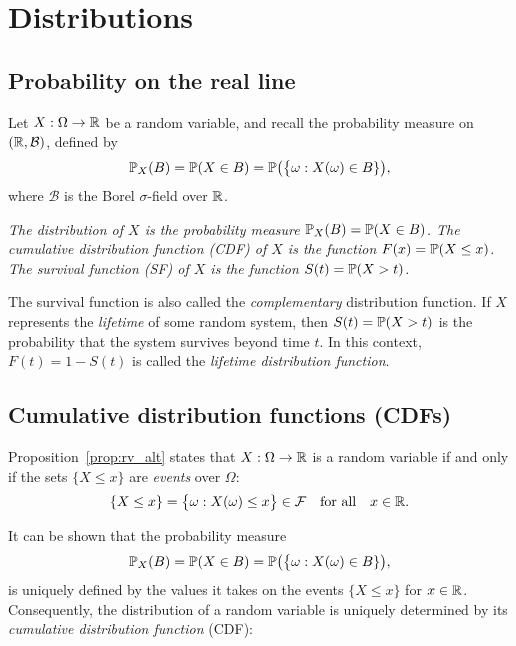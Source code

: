 \chapter{Distributions}\label{chap:distributions}
\section{Probability on the real line}
Let $X:\Omega\to\mathbb{R}$ be a random variable, and recall the probability measure on $(\mathbb{R}, \mathcal{B})$,  defined by
\[
\mathbb{P}_X(B) = \mathbb{P}(X\in B) = \mathbb{P}\big(\big\{\omega:X(\omega)\in B\}\big),
\]
where $\mathcal{B}$ is the Borel $\sigma$-field over $\mathbb{R}$.

\begin{definition}
\ben
\it
The \emph{distribution} of $X$ is the probability measure $\mathbb{P}_X(B) = \mathbb{P}(X\in B)$.
\it 
The \emph{cumulative distribution function} (CDF) of $X$ is the function $F(x) = \mathbb{P}(X\leq x)$.
\it 
The \emph{survival function} (SF) of $X$ is the function $S(t) = \mathbb{P}(X > t)$.
\een
\end{definition}

\begin{remark}
The survival function is also called the \emph{complementary} distribution function.
If $X$ represents the \emph{lifetime} of some random system, then $S(t)=\mathbb{P}(X>t)$ is the probability that the system survives beyond time $t$. In this context, $F(t) = 1 - S(t)$ is called the \emph{lifetime distribution function}.
\end{remark}


\section{Cumulative distribution functions (CDFs)}
Proposition~\ref{prop:rv_alt} states that $X:\Omega\to\mathbb{R}$ is a random variable if and only if the sets $\{X\leq x\}$ are \emph{events} over $\Omega$:
\[
\{X\leq x\} = \big\{\omega:X(\omega)\leq x\big\}\in\mathcal{F} \text{\quad for all\quad} x\in\mathbb{R}.
\]

It can be shown that the probability measure
\[
\mathbb{P}_X(B) = \mathbb{P}(X\in B) = \mathbb{P}\big(\big\{\omega:X(\omega)\in B\}\big),
\]
is uniquely defined by the values it takes on the events $\{X\leq x\}$ for $x\in\mathbb{R}$. Consequently, the distribution of a random variable is uniquely determined by its \emph{cumulative distribution function} (CDF):


